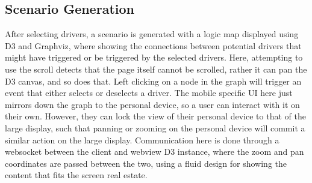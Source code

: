 
\subsection{Scenario Generation}

After selecting drivers, a scenario is generated with a logic
map displayed using D3 and Graphviz, where showing the connections
between potential drivers that might have triggered or be triggered
by the selected drivers. Here, attempting to use the scroll detects
that the page itself cannot be scrolled, rather it can pan the D3
canvas, and so does that. Left clicking on a node in the graph
will trigger an event that either selects or deselects a driver. The
mobile specific UI here just mirrors down the graph to the personal
device, so a user can interact with it on their own. However, they can
lock the view of their personal device to that of the large display,
such that panning or zooming on the personal device will commit a
similar action on the large display. Communication here is done
through a websocket between the client and webview D3 instance,
where the zoom and pan coordinates are passed between the two, using
a fluid design for showing the content that fits the screen
real estate.

